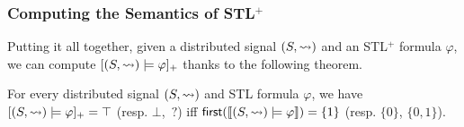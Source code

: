 \subsubsection{Computing the Semantics of STL$^+$}

Putting it all together, given a distributed signal $(S, {\rightsquigarrow})$ and an STL$^+$ formula $\varphi$, we can compute $[(S,{\rightsquigarrow}) \models \varphi]_+$ thanks to the following theorem.

\begin{theorem} \label{cl:algo}
	For every distributed signal $(S,{\rightsquigarrow})$ and STL formula $\varphi$, we have $[(S,{\rightsquigarrow}) \models \varphi]_+ = \top$ (resp. $\bot$, ${\,?}$) iff $\textsf{first}(\llbracket (S, {\rightsquigarrow}) \models \varphi \rrbracket) = \{1\}$ (resp. $\{0\}$, $\{0,1\}$).
\end{theorem}

%	
%	
%	
%	


